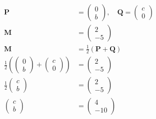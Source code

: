 \documentclass[journal]{IEEEtran}
\numberwithin{equation}{enumi}
\numberwithin{figure}{enumi}
\begin{document}
\begin{align}
\mathbf{P} &= \begin{pmatrix} 0 \\ b \end{pmatrix}, \quad \mathbf{Q} = \begin{pmatrix} c \\ 0 \end{pmatrix} \\
\mathbf{M} &= \begin{pmatrix} 2 \\ -5 \end{pmatrix} \\
\mathbf{M} &= \frac{1}{2} (\mathbf{P} + \mathbf{Q}) \\
\frac{1}{2} \left(\begin{pmatrix} 0 \\ b \end{pmatrix} + \begin{pmatrix} c \\ 0 \end{pmatrix}\right) &= \begin{pmatrix} 2 \\ -5 \end{pmatrix} \\
\frac{1}{2} \begin{pmatrix} c \\ b \end{pmatrix} &= \begin{pmatrix} 2 \\ -5 \end{pmatrix} \\
\begin{pmatrix} c \\ b \end{pmatrix} &= \begin{pmatrix} 4 \\ -10 \end{pmatrix}
\end{align}
\end{document}
